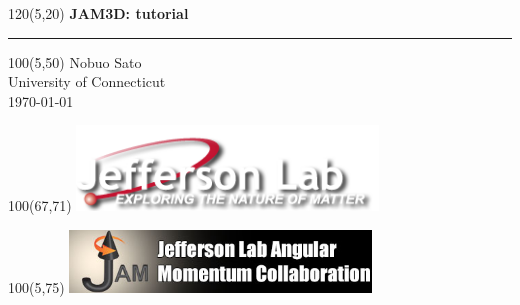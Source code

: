 \begin{frame}

\begin{textblock}{120}(5,20) 
\Large
\textbf{JAM3D: tutorial}
\\
{\color{b}\noindent\rule{10cm}{1.4pt}}
\end{textblock}

\begin{textblock}{100}(5,50) 
\Large
Nobuo Sato\\ 
\normalsize
University of Connecticut \\
\today
\end{textblock}


\begin{textblock}{100}(67,71) 
\includegraphics[width=0.6\textwidth]{gallery/logos/jlab}
\end{textblock}

\begin{textblock}{100}(5,75) 
\includegraphics[width=0.6\textwidth]{gallery/logos/jam}
\end{textblock}

\end{frame}




